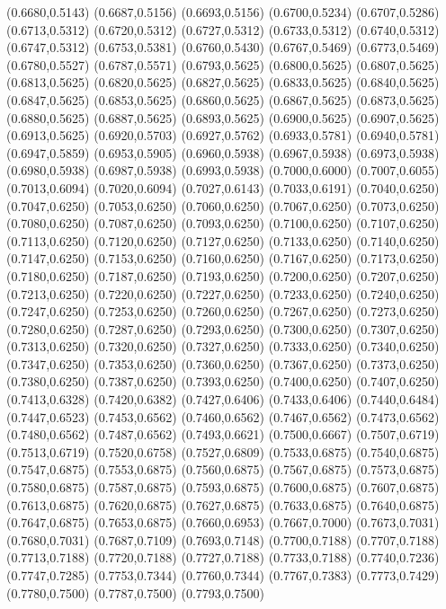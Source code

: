 {(0.6680,0.5143) (0.6687,0.5156) (0.6693,0.5156) (0.6700,0.5234) (0.6707,0.5286) (0.6713,0.5312)
(0.6720,0.5312) (0.6727,0.5312) (0.6733,0.5312) (0.6740,0.5312) (0.6747,0.5312) (0.6753,0.5381)
(0.6760,0.5430) (0.6767,0.5469) (0.6773,0.5469) (0.6780,0.5527) (0.6787,0.5571) (0.6793,0.5625)
(0.6800,0.5625) (0.6807,0.5625) (0.6813,0.5625) (0.6820,0.5625) (0.6827,0.5625) (0.6833,0.5625)
(0.6840,0.5625) (0.6847,0.5625) (0.6853,0.5625) (0.6860,0.5625) (0.6867,0.5625) (0.6873,0.5625)
(0.6880,0.5625) (0.6887,0.5625) (0.6893,0.5625) (0.6900,0.5625) (0.6907,0.5625) (0.6913,0.5625)
(0.6920,0.5703) (0.6927,0.5762) (0.6933,0.5781) (0.6940,0.5781) (0.6947,0.5859) (0.6953,0.5905)
(0.6960,0.5938) (0.6967,0.5938) (0.6973,0.5938) (0.6980,0.5938) (0.6987,0.5938) (0.6993,0.5938)
(0.7000,0.6000) (0.7007,0.6055) (0.7013,0.6094) (0.7020,0.6094) (0.7027,0.6143) (0.7033,0.6191)
(0.7040,0.6250) (0.7047,0.6250) (0.7053,0.6250) (0.7060,0.6250) (0.7067,0.6250) (0.7073,0.6250)
(0.7080,0.6250) (0.7087,0.6250) (0.7093,0.6250) (0.7100,0.6250) (0.7107,0.6250) (0.7113,0.6250)
(0.7120,0.6250) (0.7127,0.6250) (0.7133,0.6250) (0.7140,0.6250) (0.7147,0.6250) (0.7153,0.6250)
(0.7160,0.6250) (0.7167,0.6250) (0.7173,0.6250) (0.7180,0.6250) (0.7187,0.6250) (0.7193,0.6250)
(0.7200,0.6250) (0.7207,0.6250) (0.7213,0.6250) (0.7220,0.6250) (0.7227,0.6250) (0.7233,0.6250)
(0.7240,0.6250) (0.7247,0.6250) (0.7253,0.6250) (0.7260,0.6250) (0.7267,0.6250) (0.7273,0.6250)
(0.7280,0.6250) (0.7287,0.6250) (0.7293,0.6250) (0.7300,0.6250) (0.7307,0.6250) (0.7313,0.6250)
(0.7320,0.6250) (0.7327,0.6250) (0.7333,0.6250) (0.7340,0.6250) (0.7347,0.6250) (0.7353,0.6250)
(0.7360,0.6250) (0.7367,0.6250) (0.7373,0.6250) (0.7380,0.6250) (0.7387,0.6250) (0.7393,0.6250)
(0.7400,0.6250) (0.7407,0.6250) (0.7413,0.6328) (0.7420,0.6382) (0.7427,0.6406) (0.7433,0.6406)
(0.7440,0.6484) (0.7447,0.6523) (0.7453,0.6562) (0.7460,0.6562) (0.7467,0.6562) (0.7473,0.6562)
(0.7480,0.6562) (0.7487,0.6562) (0.7493,0.6621) (0.7500,0.6667) (0.7507,0.6719) (0.7513,0.6719)
(0.7520,0.6758) (0.7527,0.6809) (0.7533,0.6875) (0.7540,0.6875) (0.7547,0.6875) (0.7553,0.6875)
(0.7560,0.6875) (0.7567,0.6875) (0.7573,0.6875) (0.7580,0.6875) (0.7587,0.6875) (0.7593,0.6875)
(0.7600,0.6875) (0.7607,0.6875) (0.7613,0.6875) (0.7620,0.6875) (0.7627,0.6875) (0.7633,0.6875)
(0.7640,0.6875) (0.7647,0.6875) (0.7653,0.6875) (0.7660,0.6953) (0.7667,0.7000) (0.7673,0.7031)
(0.7680,0.7031) (0.7687,0.7109) (0.7693,0.7148) (0.7700,0.7188) (0.7707,0.7188) (0.7713,0.7188)
(0.7720,0.7188) (0.7727,0.7188) (0.7733,0.7188) (0.7740,0.7236) (0.7747,0.7285) (0.7753,0.7344)
(0.7760,0.7344) (0.7767,0.7383) (0.7773,0.7429) (0.7780,0.7500) (0.7787,0.7500) (0.7793,0.7500)
}
